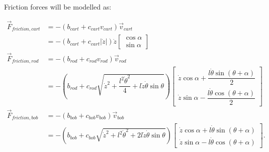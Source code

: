 \documentclass[12pt,a4paper,portrait]{article}
\begin{document}
	Friction forces will be modelled as:
	
	\begin{align*}
		\vec{F}_{friction, cart} &= -(b_{cart}+c_{cart}v_{cart})\vec{v}_{cart} \\
		&= -(b_{cart} + c_{cart}|\dot{z}|)\dot{z}\begin{bmatrix}
			\cos{\alpha} \\
			\sin{\alpha}
		\end{bmatrix} \\
		\vec{F}_{friction,rod} &= -(b_{rod}+c_{rod}v_{rod})\vec{v}_{rod} \\
		&= -\left(b_{rod} + c_{rod}\sqrt{\dot{z}^2+\dfrac{l^2\dot{\theta}^2}{4}+l\dot{z}\dot{\theta}\sin{\theta}}\right)\begin{bmatrix}
			\dot{z}\cos{\alpha} + \dfrac{l\dot{\theta}\sin{(\theta+\alpha)}}{2}\\
			\dot{z}\sin{\alpha} - \dfrac{l\dot{\theta}\cos{(\theta+\alpha)}}{2}
		\end{bmatrix}\\
		\vec{F}_{friction,bob} &= -(b_{bob}+c_{bob}v_{bob})\vec{v}_{bob} \\
		&= -\left(b_{bob} + c_{bob}\sqrt{\dot{z}^2+l^2\dot{\theta}^2+2l\dot{z}\dot{\theta}\sin{\theta}}\right)\begin{bmatrix}
			\dot{z}\cos{\alpha} + l\dot{\theta}\sin{(\theta+\alpha)}\\
			\dot{z}\sin{\alpha} - l\dot{\theta}\cos{(\theta+\alpha)}
		\end{bmatrix}.
	\end{align*}
	
\end{document}
